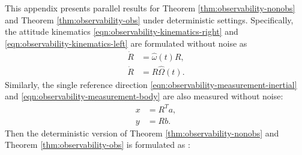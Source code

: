 This appendix presents parallel results for Theorem \ref{thm:observability-nonobs} and Theorem \ref{thm:observability-obs} under deterministic settings.
Specifically, the attitude kinematics \eqref{eqn:observability-kinematics-right} and \eqref{eqn:observability-kinematics-left} are formulated without noise as
\begin{align}
	\dot{R} &= \hat{\omega}(t) R, \label{eqn:observability-kinematics-right-deterministic} \\
	\dot{R} &= R\hat{\Omega}(t). \label{eqn:observability-kinematics-left-deterministic}
\end{align}
Similarly, the single reference direction \eqref{eqn:observability-measurement-inertial} and \eqref{eqn:observability-measurement-body} are also measured without noise:
\begin{align}
	x &= R^Ta, \label{eqn:observability-measurement-inertial-deterministic} \\
	y &= Rb. \label{eqn:observability-measurement-body-deterministic}
\end{align}
Then the deterministic version of Theorem \ref{thm:observability-nonobs} and Theorem \ref{thm:observability-obs} is formulated as \cite{hermann1977nonlinear}:

